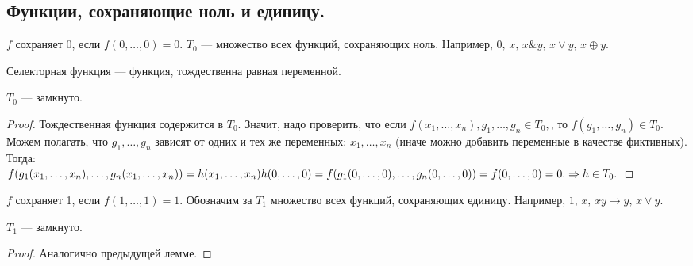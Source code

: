 \subsection{Функции, сохраняющие ноль и единицу.}
\begin{definition}
	$f$ сохраняет 0, если $f(0,\ldots, 0)=0$.
	$T_0$ --- множество всех функций, сохраняющих ноль. Например, $0,\,x,\,x \& y,\, x \vee y,\, x \oplus y$.
\end{definition}
\begin{definition}
	Селекторная функция --- функция, тождественна равная переменной. 
\end{definition}
\begin{lemma}
	$T_0 $ --- замкнуто. 
\end{lemma}
\begin{proof}
	Тождественная функция содержится в $T_0$. Значит, надо проверить, что если $f(x_1,\ldots, x_n),g_1, \ldots, g_n \in T_0, \text{, то~} f(g_1, \ldots, g_n) \in T_0.$ \\
	Можем полагать, что $g_1, \ldots, g_n$ зависят от одних и тех же переменных: $x_1, \ldots, x_n$ (иначе можно добавить переменные в качестве фиктивных). Тогда:\\
	$f(g_1(x_1, \ldots, x_n),\ldots, g_n(x_1, \ldots, x_n))=h(x_1, \ldots, x_n) \\
	h(0, \ldots, 0)=f(g_1(0,\ldots,0),\ldots,g_n(0, \ldots, 0))=f(0,\ldots,0)=0. \Rightarrow h \in T_0. 
$
\end{proof}
\begin{definition}
	$f$ сохраняет 1, если $f(1,\ldots, 1)=1$.
	Обозначим за $T_1$ множество всех функций, сохраняющих единицу. Например, $1,\,x,\,xy\rightarrow y, \,x \vee y$.
\end{definition}
\begin{lemma}
	$T_1 $ --- замкнуто. 
\end{lemma}
\begin{proof}
	Аналогично предыдущей лемме. 
\end{proof}
